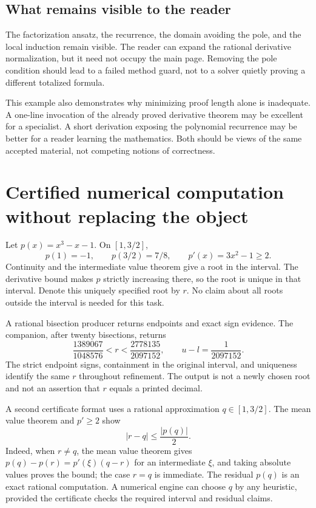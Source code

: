 \documentclass[11pt,letterpaper]{article}
\theoremstyle{definition}
\begin{document}
\subsection{What remains visible to the reader}
The factorization ansatz, the recurrence, the domain avoiding the pole, and the
local induction remain visible. The reader can expand the rational derivative
normalization, but it need not occupy the main page. Removing the pole condition
should lead to a failed method guard, not to a solver quietly proving a different
totalized formula.

This example also demonstrates why minimizing proof length alone is inadequate.
A one-line invocation of the already proved derivative theorem may be excellent
for a specialist. A short derivation exposing the polynomial recurrence may be
better for a reader learning the mathematics. Both should be views of the same
accepted material, not competing notions of correctness.

\section{Certified numerical computation without replacing the object}\label{sec:numerical}
Let \(p(x)=x^3-x-1\). On \([1,3/2]\),
\[
 p(1)=-1,\qquad p(3/2)=7/8,\qquad p'(x)=3x^2-1\ge2.
\]
Continuity and the intermediate value theorem give a root in the interval.
The derivative bound makes \(p\) strictly increasing there, so the root is unique
in that interval. Denote this uniquely specified root by \(r\). No claim about
all roots outside the interval is needed for this task.

A rational bisection producer returns endpoints and exact sign evidence. The
companion, after twenty bisections, returns
\begin{equation}\label{eq:bracket}
 \frac{1389067}{1048576}<r<\frac{2778135}{2097152},
 \qquad u-l=\frac1{2097152}.
\end{equation}
The strict endpoint signs, containment in the original interval, and uniqueness
identify the same \(r\) throughout refinement. The output is not a newly chosen
root and not an assertion that \(r\) equals a printed decimal.

A second certificate format uses a rational approximation \(q\in[1,3/2]\).
The mean value theorem and \(p'\ge2\) show
\begin{equation}\label{eq:residual}
 |r-q|\le\frac{|p(q)|}{2}.
\end{equation}
Indeed, when \(r\ne q\), the mean value theorem gives
\(p(q)-p(r)=p'(\xi)(q-r)\) for an intermediate \(\xi\), and taking absolute values
proves the bound; the case \(r=q\) is immediate. The residual \(p(q)\) is an exact
rational computation. A numerical engine can choose \(q\) by any heuristic,
provided the certificate checks the required interval and residual claims.
\end{document}
